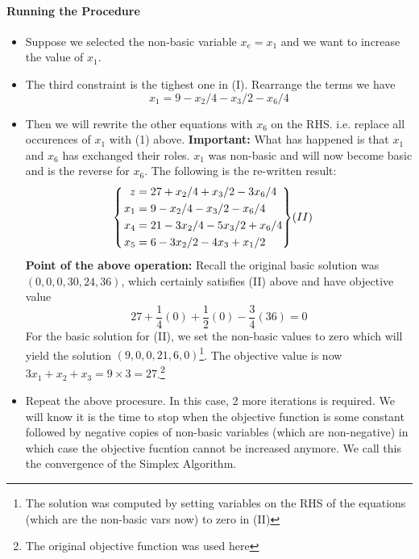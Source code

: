 \documentclass[10pt]{article}
\newenvironment{rcases}
  {\left.\begin{aligned}}
  {\end{aligned}\right\rbrace}
\begin{document}
\paragraph{Running the Procedure}
\begin{itemize}
    \item Suppose we selected the non-basic variable $x_e = x_1$ and we want to increase the value of $x_1$. 
    \item The third constraint is the tighest one in (I). Rearrange the terms we have 
        \begin{equation}
            x_1 = 9 - x_2/4 - x_3/2 - x_6/4
        \end{equation}
    \item Then we will rewrite the other equations with $x_6$ on the RHS. i.e. replace all occurences of $x_1$ with (1) above. \textbf{Important:} What has happened is that $x_1$ and $x_6$ has exchanged their roles. $x_1$ was non-basic and will now become basic and is the reverse for $x_6$. The following is the re-written result:
        \begin{equation*}
            \begin{cases}
                \begin{rcases}
                z &= 27 + x_2/4 + x_3/2 - 3x_6 /4 \\
                x_1 &= 9 - x_2/4 - x_3/2 - x_6/4 \\
                x_4 &= 21 - 3x_2/4 - 5x_3/2 +  x_6/4 \\
                x_5 &= 6 - 3x_2/2 - 4x_3 + x_1/2 
                \end{rcases}
                (II)
            \end{cases}
        \end{equation*}
    \textbf{Point of the above operation:} Recall the original basic solution was $(0,0,0,30,24,36)$, which certainly satisfies (II) above and have objective value
        \begin{equation*}
            27 + \frac{1}{4}(0) + \frac{1}{2}(0) - \frac{3}{4}(36) = 0
        \end{equation*}
    For the basic solution for (II), we set the non-basic values to zero which will yield the solution $(9,0,0,21,6,0)$\footnote{The solution was computed by setting variables on the RHS of the equations (which are the non-basic vars now) to zero in (II)}. The objective value is now $3x_1+x_2 + x_3 = 9 \times 3 = 27$.\footnote{The original objective function was used here}
    \item Repeat the above procesure. In this case, 2 more iterations is required. We will know it is the time to stop when the objective function is some constant followed by negative copies of non-basic variables (which are non-negative) in which case the objective fucntion cannot be increased anymore. We call this the convergence of the Simplex Algorithm.
\end{itemize}
  
\end{document}

